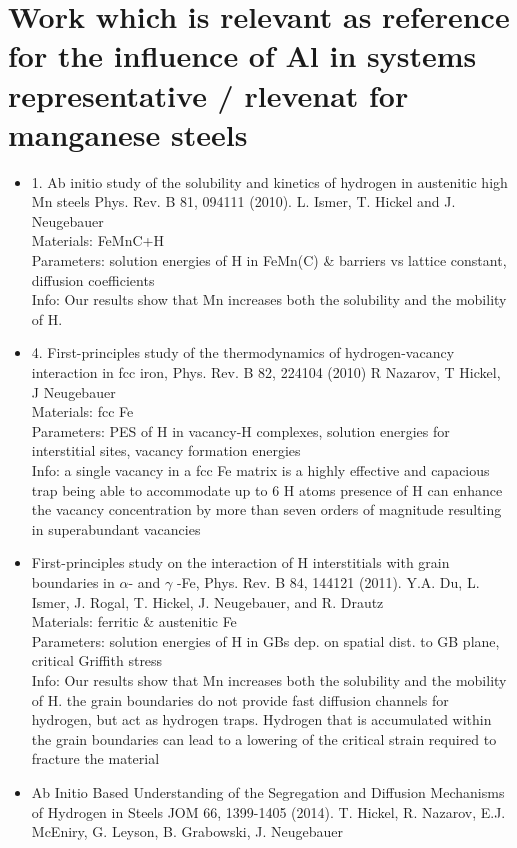 \documentclass[11pt,floatfix,showpacs]{amsart}
\newcommand{\se}{\section}
\begin{document}
\se{Work which is relevant as reference for the influence of Al in systems representative / rlevenat for manganese steels}

\begin{itemize}
\item 1.	Ab initio study of the solubility and kinetics of hydrogen in austenitic high Mn steels
Phys. Rev. B 81, 094111 (2010).
L. Ismer, T. Hickel and J. Neugebauer\\
Materials: FeMnC+H\\
Parameters: solution energies of H in FeMn(C) \& barriers vs lattice constant, diffusion coefficients\\
Info: Our results show that Mn increases both the solubility and the mobility of H.
\item 4.	First-principles study of the thermodynamics of hydrogen-vacancy interaction in fcc iron, 
Phys. Rev. B 82, 224104 (2010)
R Nazarov, T Hickel, J Neugebauer\\
Materials: fcc Fe \\
Parameters: PES of H in vacancy-H complexes, solution energies for interstitial sites, vacancy formation energies\\
Info: a single vacancy in a fcc Fe matrix is a highly effective and capacious trap being able to accommodate up to 6 H atoms  presence of H can enhance the vacancy concentration by more than seven orders of magnitude resulting in superabundant vacancies

\item 	First-principles study on the interaction of H interstitials with grain boundaries in $\alpha$- and $\gamma$ -Fe, 
Phys. Rev. B 84, 144121 (2011).
Y.A. Du, L. Ismer, J. Rogal, T. Hickel, J. Neugebauer, and R. Drautz\\
Materials: ferritic \& austenitic Fe\\
Parameters: solution energies of H in GBs dep. on spatial dist. to GB plane, critical Griffith stress\\
Info: Our results show that Mn increases both the solubility and the mobility of H. the grain boundaries do not provide fast diffusion channels for hydrogen, but act as hydrogen traps. Hydrogen that is accumulated within the grain boundaries can lead to a lowering of the critical strain required to fracture the material
\item Ab Initio Based Understanding of the Segregation and Diffusion Mechanisms of Hydrogen in Steels
JOM 66, 1399-1405 (2014).
T. Hickel, R. Nazarov, E.J. McEniry, G. Leyson, B. Grabowski, J. Neugebauer


\end{itemize}
\end{document}
